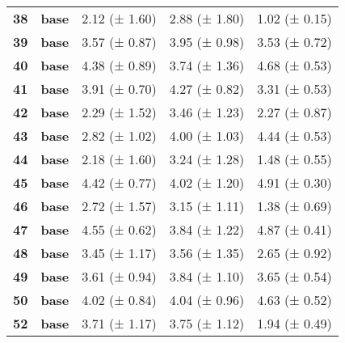 \begin{longtable}{lllll}
\cline{1-5}
\textbf{38} & \textbf{base} & 2.12 (± 1.60) & 2.88 (± 1.80) & 1.02 (± 0.15) \\
\cline{1-5}
\textbf{39} & \textbf{base} & 3.57 (± 0.87) & 3.95 (± 0.98) & 3.53 (± 0.72) \\
\cline{1-5}
\textbf{40} & \textbf{base} & 4.38 (± 0.89) & 3.74 (± 1.36) & 4.68 (± 0.53) \\
\cline{1-5}
\textbf{41} & \textbf{base} & 3.91 (± 0.70) & 4.27 (± 0.82) & 3.31 (± 0.53) \\
\cline{1-5}
\textbf{42} & \textbf{base} & 2.29 (± 1.52) & 3.46 (± 1.23) & 2.27 (± 0.87) \\
\cline{1-5}
\textbf{43} & \textbf{base} & 2.82 (± 1.02) & 4.00 (± 1.03) & 4.44 (± 0.53) \\
\cline{1-5}
\textbf{44} & \textbf{base} & 2.18 (± 1.60) & 3.24 (± 1.28) & 1.48 (± 0.55) \\
\cline{1-5}
\textbf{45} & \textbf{base} & 4.42 (± 0.77) & 4.02 (± 1.20) & 4.91 (± 0.30) \\
\cline{1-5}
\textbf{46} & \textbf{base} & 2.72 (± 1.57) & 3.15 (± 1.11) & 1.38 (± 0.69) \\
\cline{1-5}
\textbf{47} & \textbf{base} & 4.55 (± 0.62) & 3.84 (± 1.22) & 4.87 (± 0.41) \\
\cline{1-5}
\textbf{48} & \textbf{base} & 3.45 (± 1.17) & 3.56 (± 1.35) & 2.65 (± 0.92) \\
\cline{1-5}
\textbf{49} & \textbf{base} & 3.61 (± 0.94) & 3.84 (± 1.10) & 3.65 (± 0.54) \\
\cline{1-5}
\textbf{50} & \textbf{base} & 4.02 (± 0.84) & 4.04 (± 0.96) & 4.63 (± 0.52) \\
\cline{1-5}
\textbf{52} & \textbf{base} & 3.71 (± 1.17) & 3.75 (± 1.12) & 1.94 (± 0.49) \\
\cline{1-5}
\end{longtable}
